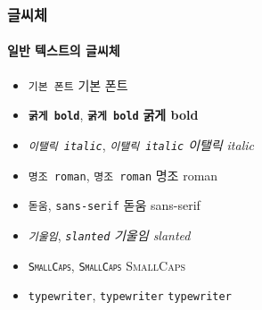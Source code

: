   \begin{frame}[fragile]
    \frametitle{글씨체}
    \framesubtitle{일반 텍스트의 글씨체}
    \begin{itemize}
      \item \texttt{{\normalfont 기본 폰트}} {\normalfont 기본 폰트}
      \item \texttt{\textbf{굵게 bold}}, \texttt{{\bfseries 굵게 bold}} \textbf{굵게 bold}
      \item \texttt{\textit{이탤릭 italic}}, \texttt{{\itshape 이탤릭 italic}} \textit{이탤릭 italic}
      \item \texttt{\textrm{명조 roman}}, \texttt{{\rmfamily 명조 roman}} \textrm{명조 roman}
      \item \texttt{\textsf{돋움}}, \texttt{{\sffamily sans-serif}} \textsf{돋움 sans-serif}
      \item \texttt{\textsl{기울임}}, \texttt{{\slshape slanted}} \textsl{기울임 slanted}
      \item \texttt{\textsc{SmallCaps}}, \texttt{{\scshape SmallCaps}} \textsc{SmallCaps}
      \item \texttt{\texttt{typewriter}}, \texttt{{\ttfamily typewriter}} \texttt{typewriter}
    \end{itemize}
  \end{frame}
  
